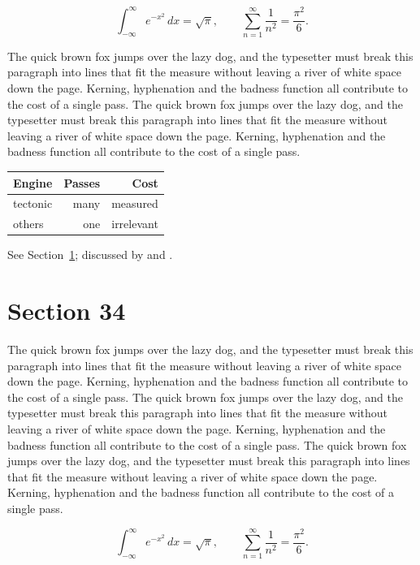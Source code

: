\documentclass{article}
\begin{document}
\begin{equation}\label{eq:33}
\int_{-\infty}^{\infty} e^{-x^{2}}\,dx = \sqrt{\pi}, \qquad
\sum_{n=1}^{\infty} \frac{1}{n^{2}} = \frac{\pi^{2}}{6}.
\end{equation}

The quick brown fox jumps over the lazy dog, and the typesetter must break this paragraph into lines that fit the measure without leaving a river of white space down the page. Kerning, hyphenation and the badness function all contribute to the cost of a single pass. The quick brown fox jumps over the lazy dog, and the typesetter must break this paragraph into lines that fit the measure without leaving a river of white space down the page. Kerning, hyphenation and the badness function all contribute to the cost of a single pass. 

\begin{center}
\begin{tabular}{lrr}
\toprule
Engine & Passes & Cost \\
\midrule
tectonic & many & measured \\
others & one & irrelevant \\
\bottomrule
\end{tabular}
\end{center}

See Section~\ref{sec:34}; discussed by \textcite{k4} and \textcite{l1}.
\section{Section 34}
\label{sec:34}
The quick brown fox jumps over the lazy dog, and the typesetter must break this paragraph into lines that fit the measure without leaving a river of white space down the page. Kerning, hyphenation and the badness function all contribute to the cost of a single pass. The quick brown fox jumps over the lazy dog, and the typesetter must break this paragraph into lines that fit the measure without leaving a river of white space down the page. Kerning, hyphenation and the badness function all contribute to the cost of a single pass. The quick brown fox jumps over the lazy dog, and the typesetter must break this paragraph into lines that fit the measure without leaving a river of white space down the page. Kerning, hyphenation and the badness function all contribute to the cost of a single pass. 

\begin{equation}\label{eq:34}
\int_{-\infty}^{\infty} e^{-x^{2}}\,dx = \sqrt{\pi}, \qquad
\sum_{n=1}^{\infty} \frac{1}{n^{2}} = \frac{\pi^{2}}{6}.
\end{equation}
\end{document}
